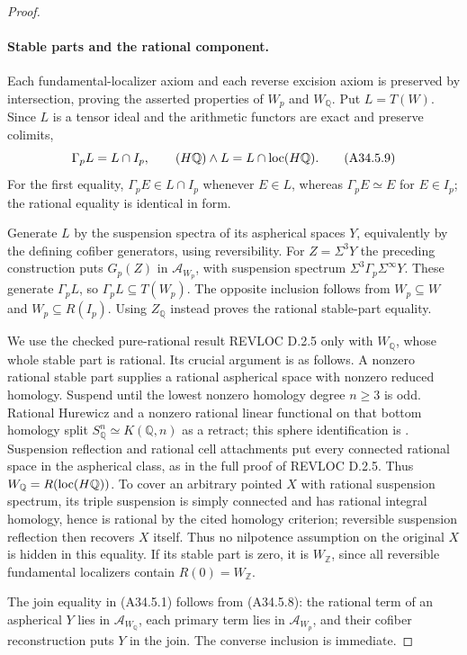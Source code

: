 \begin{proof}
\paragraph{Stable parts and the rational component.}
Each fundamental-localizer axiom and each reverse excision axiom
is preserved by intersection, proving the asserted properties of
$W_p$ and $W_{\mathbb Q}$.  Put $L=T(W)$.  Since $L$ is a
tensor ideal and the arithmetic functors are exact and preserve
colimits,
\[
 \Gamma_pL=L\cap I_p,\qquad
 (H\mathbb Q)\wedge L=L\cap\operatorname{loc}(H\mathbb Q).
 \tag{A34.5.9}
\]
For the first equality, $\Gamma_pE\in L\cap I_p$ whenever
$E\in L$, whereas $\Gamma_pE\simeq E$ for $E\in I_p$;
the rational equality is identical in form.

Generate $L$ by the suspension spectra of its aspherical spaces
$Y$, equivalently by the defining cofiber generators, using
reversibility.  For $Z=\Sigma^3Y$ the preceding construction puts
$G_p(Z)$ in $\mathcal A_{W_p}$, with suspension spectrum
$\Sigma^3\Gamma_p\Sigma^\infty Y$.
These generate $\Gamma_pL$, so $\Gamma_pL\subseteq T(W_p)$.
The opposite inclusion follows from $W_p\subseteq W$ and
$W_p\subseteq R(I_p)$.  Using $Z_{\mathbb Q}$ instead proves
the rational stable-part equality.

We use the checked pure-rational result REVLOC D.2.5 only with
$W_{\mathbb Q}$, whose whole stable part is rational.  Its crucial
argument is as follows.  A nonzero rational stable part supplies a
rational aspherical space with nonzero reduced homology.  Suspend
until the lowest nonzero homology degree $n\geq3$ is odd.
Rational Hurewicz and a nonzero rational linear functional on that
bottom homology split $S^n_{\mathbb Q}\simeq K(\mathbb Q,n)$
as a retract; this sphere identification is
\citet[Corollary 6.7.3]{A3MayPonto2012}.
Suspension reflection and rational cell attachments put every
connected rational space in the aspherical class, as in the full
proof of REVLOC D.2.5.  Thus $W_{\mathbb Q}=R(\operatorname{loc}(H\mathbb Q))$.
To cover an arbitrary pointed $X$ with rational suspension spectrum,
its triple suspension is simply connected and has rational integral
homology, hence is rational by the cited homology criterion; reversible
suspension reflection then recovers $X$ itself.  Thus no nilpotence
assumption on the original $X$ is hidden in this equality.
If its stable part is zero, it is $W_{\mathbb Z}$, since all
reversible fundamental localizers contain $R(0)=W_{\mathbb Z}$.

The join equality in \textup{(A34.5.1)} follows from
\textup{(A34.5.8)}: the rational term of an aspherical $Y$ lies
in $\mathcal A_{W_{\mathbb Q}}$, each primary term lies in
$\mathcal A_{W_p}$, and their cofiber reconstruction puts $Y$
in the join.  The converse inclusion is immediate.


\end{proof}
